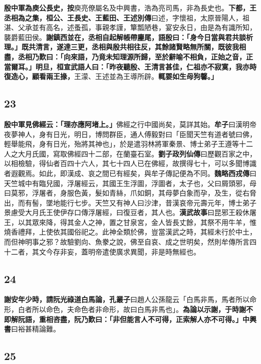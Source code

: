\textbf{殷中軍為庾公長史，}{\footnotesize \textbf{按}庾亮僚屬名及中興書，浩為亮司馬，非為長史也。}\textbf{下都，王丞相為之集，桓公、王長史、王藍田、}{\footnotesize \textbf{王述別傳}曰述，字懷祖，太原晉陽人，祖湛、父承並有高名，述蚤孤，事親孝謹，簞瓢陋巷，宴安永日，由是為有識所知，襲爵藍田侯。}\textbf{謝鎮西並在，丞相自起解帳帶麈尾，語殷曰：「身今日當與君共談析理。」既共清言，遂達三更，丞相與殷共相往反，其餘諸賢略無所關，既彼我相盡，丞相乃歎曰：「向來語，乃竟未知理源所歸，至於辭喻不相負，正始之音，正當爾耳。」明旦，桓宣武語人曰：「昨夜聽殷、王清言甚佳，仁祖亦不寂寞，我亦時復造心，顧看兩王掾，}{\footnotesize 王濛、王述並為王導所辟。}\textbf{輒翣如生母狗馨。」}

\subsection*{23}

\textbf{殷中軍見佛經云：「理亦應阿堵上。」}{\footnotesize 佛經之行中國尚矣，莫詳其始。\textbf{牟子}曰漢明帝夜夢神人，身有日光，明日，博問群臣，通人傅毅對曰「臣聞天竺有道者號曰佛，輕舉能飛，身有日光，殆將其神也」，於是遣羽林將軍秦景、博士弟子王遵等十二人之大月氏國，寫取佛經四十二部，在蘭臺石室。\textbf{劉子政列仙傳}曰歷觀百家之中，以相檢驗，得仙者百四十六人，其七十四人已在佛經，故撰得七十，可以多聞博識者遐觀焉。如此，即漢成、哀之間已有經矣，與牟子傳記便為不同。\textbf{魏略西戎傳}曰天竺城中有臨兒國，浮屠經云，其國王生浮圖，浮圖者，太子也，父曰屑頭邪，母曰莫邪，浮屠者，身服色黃，髮如青絲，爪如銅，其母夢白象而孕，及生，從右脅出，而有髻，墜地能行七步。天竺又有神人曰沙津，昔漢哀帝元壽元年，博士弟子景慮受大月氏王使伊存口傳浮屠經，曰復豆者，其人也。\textbf{漢武故事}曰昆邪王殺休屠王，以其眾來降，得其金人之神，置之甘泉宮，金人皆長丈餘，其祭不用牛羊，惟燒香禮拜，上使依其國俗祀之。此神全類於佛，豈當漢武之時，其經未行於中土，而但神明事之邪？故驗劉向、魚豢之說，佛至自哀、成之世明矣，然則牟傳所言四十二者，其文今存非妄，蓋明帝遣使廣求異聞，非是時無經也。}

\subsection*{24}

\textbf{謝安年少時，請阮光祿道白馬論，}{\footnotesize \textbf{孔叢子}曰趙人公孫龍云「白馬非馬，馬者所以命形，白者所以命色，夫命色者非命形，故曰白馬非馬也」。}\textbf{為論以示謝，于時謝不即解阮語，重相咨盡，阮乃歎曰：「非但能言人不可得，正索解人亦不可得。」}{\footnotesize \textbf{中興書}曰裕甚精論難。}

\subsection*{25}

